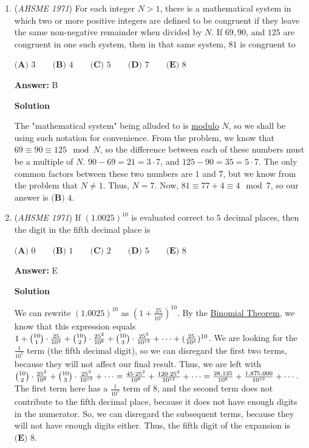 \begin{enumerate}
 $15+9=24$, which is $\mathrm{XXIV}$ as a roman numeral, and thus the answer is $\boxed{\textbf{(D) }\mathrm{XXIV}}.$



	\item (\textit{AHSME 1971}) For each integer $N>1$, there is a mathematical system in which two or more positive integers are defined 
to be congruent if they leave the same non-negative remainder when divided by $N.$ If $69,90$, and $125$ are 
congruent in one such system, then in that same system, $81$ is congruent to


 $\textbf{(A) }3\qquad \textbf{(B) }4\qquad \textbf{(C) }5\qquad \textbf{(D) }7\qquad  \textbf{(E) }8$

 \textbf{Answer: }B



\textbf{Solution}

The "mathematical system" being alluded to is \href{https://artofproblemsolving.com/wiki/index.php?title=Modulo}{modulo} $N$, so we shall be using such notation for convenience. From the problem, we know that $69 \equiv 90 \equiv 125 \mod N$, so the difference between each of these numbers must be a multiple of $N$. $90-69=21=3\cdot7$, and $125-90=35=5\cdot7$. The only common factors between these two numbers are $1$ and $7$, but we know from the problem that $N\neq1$. Thus, $N=7$. Now, $81 \equiv 77+4 \equiv 4 \mod 7$, so our answer is $\boxed{\textbf{(B) }4}$.

 


	\item (\textit{AHSME 1971}) If $(1.0025)^{10}$ is evaluated correct to $5$ decimal places, then the digit in the fifth decimal place is


 $\textbf{(A) }0\qquad \textbf{(B) }1\qquad \textbf{(C) }2\qquad \textbf{(D) }5\qquad  \textbf{(E) }8$

 \textbf{Answer: }E



\textbf{Solution}

We can rewrite $(1.0025)^{10}$ as $(1+\frac{25}{10^4})^{10}$. By the \href{https://artofproblemsolving.com/wiki/index.php?title=Binomial\_Theorem}{Binomial Theorem}, we know that this expression equals $1+ \tbinom{10}1\cdot\frac{25}{10^4}+\tbinom{10}2\cdot\frac{25^2}{10^8}+\tbinom{10}3\cdot\frac{25^3}{10^{12}}+\cdots+(\frac{25}{10^4})^{10}$. We are looking for the $\frac1{10^5}$ term (the fifth decimal digit), so we can disregard the first two terms, because they will not affect our final result. Thus, we are left with $\tbinom{10}2\cdot\frac{25^2}{10^8}+\tbinom{10}3\cdot\frac{25^3}{10^{12}}+\cdots = \frac{45\cdot25^2}{10^8}+\frac{120\cdot25^3}{10^{12}}+\cdots = \frac{28,125}{10^8}+\frac{1,875,000}{10^{12}}+\cdots$. The first term here has a $\frac1{10^5}$ term of $8$, and the second term does not contribute to the fifth decimal place, because it does not have enough digits in the numerator. So, we can disregard the subsequent terms, because they will not have enough digits either. Thus, the fifth digit of the expansion is $\boxed{\textbf{(E) }8}$.


\end{enumerate}
